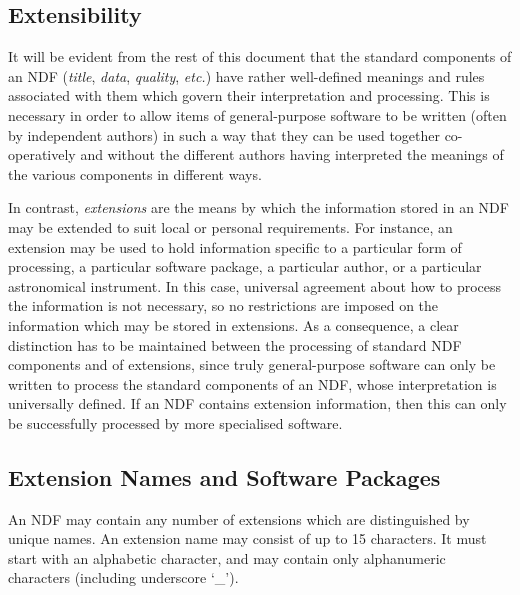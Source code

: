 \documentclass[twoside,11pt,nolof]{starlink}
\providecommand{\st}[1]{{\emph{#1}}}
\begin{document}
\subsection{Extensibility}

It will be evident from the rest of this document that the standard components
of an NDF (\st{title}, \st{data}, \st{quality}, \st{etc.}) have rather
well-defined meanings and rules associated with them which govern their
interpretation and processing.
This is necessary in order to allow items of general-purpose software to be
written (often by independent authors) in such a way that they can be used
together co-operatively and without the different authors having interpreted
the meanings of the various components in different ways.

In contrast, \st{extensions\/} are the means by which the information stored
in an NDF may be extended to suit local or personal requirements.
For instance, an extension may be used to hold information specific to a
particular form of processing, a particular software package, a particular
author, or a particular astronomical instrument.
In this case, universal agreement about how to process the information is
not necessary, so no restrictions are imposed on the information which may
be stored in extensions.
As a consequence, a clear distinction has to be maintained between the
processing of standard NDF components and of extensions, since truly
general-purpose software can only be written to process the standard
components of an NDF, whose interpretation is universally defined.
If an NDF contains extension information, then this can only be successfully
processed by more specialised software.

\subsection{Extension Names and Software Packages}

An NDF may contain any number of extensions which are distinguished
by unique names.
An extension name may consist of up to 15 characters.
It must start with an alphabetic character, and may contain only
alphanumeric characters (including underscore `\_').
\end{document}
